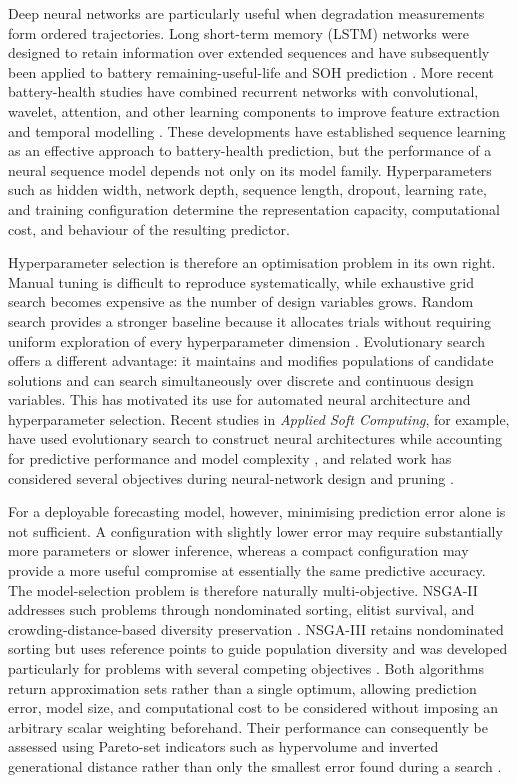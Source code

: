 \documentclass[a4paper,fleqn]{cas-sc}
\begin{document}
Deep neural networks are particularly useful when degradation measurements form ordered trajectories. Long short-term memory (LSTM) networks were designed to retain information over extended sequences \cite{hochreiter1997lstm} and have subsequently been applied to battery remaining-useful-life and SOH prediction \cite{zhang2018lstm}. More recent battery-health studies have combined recurrent networks with convolutional, wavelet, attention, and other learning components to improve feature extraction and temporal modelling \cite{yao2024cnnwnn}. These developments have established sequence learning as an effective approach to battery-health prediction, but the performance of a neural sequence model depends not only on its model family. Hyperparameters such as hidden width, network depth, sequence length, dropout, learning rate, and training configuration determine the representation capacity, computational cost, and behaviour of the resulting predictor.

Hyperparameter selection is therefore an optimisation problem in its own right. Manual tuning is difficult to reproduce systematically, while exhaustive grid search becomes expensive as the number of design variables grows. Random search provides a stronger baseline because it allocates trials without requiring uniform exploration of every hyperparameter dimension \cite{bergstra2012random}. Evolutionary search offers a different advantage: it maintains and modifies populations of candidate solutions and can search simultaneously over discrete and continuous design variables. This has motivated its use for automated neural architecture and hyperparameter selection. Recent studies in \textit{Applied Soft Computing}, for example, have used evolutionary search to construct neural architectures while accounting for predictive performance and model complexity \cite{garciagarcia2023cgpnas}, and related work has considered several objectives during neural-network design and pruning \cite{galvan2023neurotrajectory}.

For a deployable forecasting model, however, minimising prediction error alone is not sufficient. A configuration with slightly lower error may require substantially more parameters or slower inference, whereas a compact configuration may provide a more useful compromise at essentially the same predictive accuracy. The model-selection problem is therefore naturally multi-objective. NSGA-II addresses such problems through nondominated sorting, elitist survival, and crowding-distance-based diversity preservation \cite{deb2002nsga2}. NSGA-III retains nondominated sorting but uses reference points to guide population diversity and was developed particularly for problems with several competing objectives \cite{deb2014nsga3}. Both algorithms return approximation sets rather than a single optimum, allowing prediction error, model size, and computational cost to be considered without imposing an arbitrary scalar weighting beforehand. Their performance can consequently be assessed using Pareto-set indicators such as hypervolume and inverted generational distance rather than only the smallest error found during a search \cite{zitzler2003performance,ishibuchi2015igdplus}.
\end{document}
